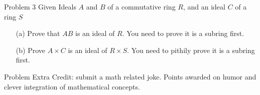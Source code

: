 \documentclass{article}
\theoremstyle{definition}
\begin{document}
\vspace{1cm}







\noindent Problem 3  %
Given Ideals $A$ and $B$ of a commutative ring $R$, and an ideal $C$ of a ring $S$
\begin{itemize}
    \item[(a)]  Prove that $AB$ is an ideal of $R$.  You need to prove it is a subring first.
    \item[(b)] Prove $A\times C$ is an ideal of $R\times S.$ You need to pithily prove it is a subring first.
\end{itemize}

\vspace{1cm}




\noindent Problem Extra Credit: submit a math related joke.  Points awarded on humor and clever integration of mathematical concepts.

\vspace{1cm}
\end{document}
